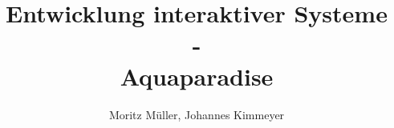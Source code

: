 \documentclass[12pt,a4paper,ngerman]{scrreprt}
\begin{document}
 \title{Entwicklung interaktiver Systeme\\
  -\\
 Aquaparadise}
\author{Moritz Müller, Johannes Kimmeyer}
\maketitle

\tableofcontents





\listoftables \listoffigures
\appendix

\printbibliography
\end{document}
